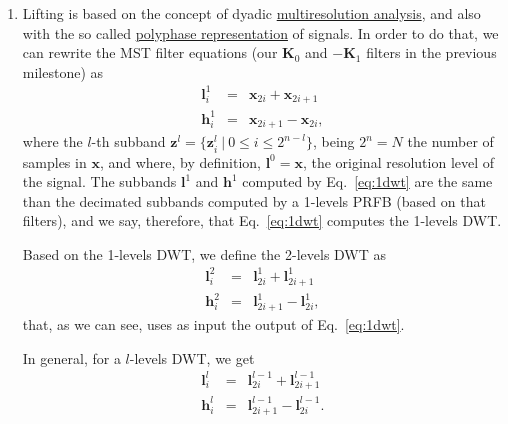 \begin{enumerate}
\item Lifting is based on the concept of dyadic
  \href{https://en.wikipedia.org/wiki/Multiresolution_analysis}{multiresolution
    analysis}, and also with the so called
  \href{https://en.wikipedia.org/wiki/Polyphase_matrix}{polyphase
    representation} of signals. In order to do that, we can rewrite
  the MST filter equations (our ${\mathbf K}_0$ and $-{\mathbf K}_1$
  filters in the previous milestone) as
  \begin{equation}
    \begin{array}{rcl}
      {\mathbf l}^1_i & = & {\mathbf x}_{2i} + {\mathbf x}_{2i+1} \\
      {\mathbf h}^1_i & = & {\mathbf x}_{2i+1} - {\mathbf x}_{2i},
    \end{array}
    \label{eq:1dwt}
  \end{equation}
  where the $l$-th subband
  ${\mathbf z}^l=\{{\mathbf z}_i^l~|~0\le i\le 2^{n-l}\}$, being
  $2^n=N$ the number of samples in ${\mathbf x}$, and where, by
  definition, ${\mathbf l}^0={\mathbf x}$, the original resolution
  level of the signal. The subbands ${\mathbf l}^1$ and
  ${\mathbf h}^1$ computed by Eq.~\eqref{eq:1dwt} are the same than the
  decimated subbands computed by a 1-levels PRFB (based on that
  filters), and we say, therefore, that Eq.~\eqref{eq:1dwt} computes the
  1-levels DWT.

  Based on the 1-levels DWT, we define the 2-levels DWT as
  \begin{equation}
    \begin{array}{rcl}
      {\mathbf l}^2_i & = & {\mathbf l}^1_{2i} + {\mathbf l}^1_{2i+1} \\
      {\mathbf h}^2_i & = & {\mathbf l}^1_{2i+1} - {\mathbf l}^1_{2i},
    \end{array}
    \label{eq:2dwt}
  \end{equation}
  that, as we can see, uses as input the output of Eq.~\eqref{eq:1dwt}.

  In general, for a $l$-levels DWT, we get
    \begin{equation}
    \begin{array}{rcl}
      {\mathbf l}^l_i & = & {\mathbf l}^{l-1}_{2i} + {\mathbf l}^{l-1}_{2i+1} \\
      {\mathbf h}^l_i & = & {\mathbf l}^{l-1}_{2i+1} - {\mathbf l}^{l-1}_{2i}.
    \end{array}
    \label{eq:ldwt}
  \end{equation}


\end{enumerate}
